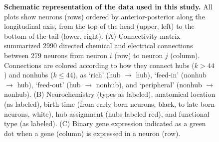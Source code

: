 \begin{figure}[h!]
 \caption{\textbf{Schematic representation of the data used in this study.}
All plots show neurons (rows) ordered by anterior-posterior along the longitudinal axis, from the top of the head (upper, left) to the bottom of the tail (lower, right).
(A) Connectivity matrix summarized 2990 directed chemical and electrical connections between 279 neurons from neuron $i$ (row) to neuron $j$ (column).
Connections are colored according to how they connect hubs ($k > 44$) and nonhubs ($k \leq 44$), as `rich' (hub $\rightarrow$ hub), `feed-in' (nonhub $\rightarrow$ hub), `feed-out' (hub $\rightarrow$ nonhub), and `peripheral' (nonhub $\rightarrow$ nonhub).
(B) Neurochemistry (types as labeled), anatomical location (as labeled), birth time (from early born neurons, black, to late-born neurons, white), hub assignment (hubs labeled red), and functional type (as labeled).
(C) Binary gene expression indicated as a green dot when a gene (column) is expressed in a neuron (row).}
\label{fig:Ch2Fig1}
\end{figure}



